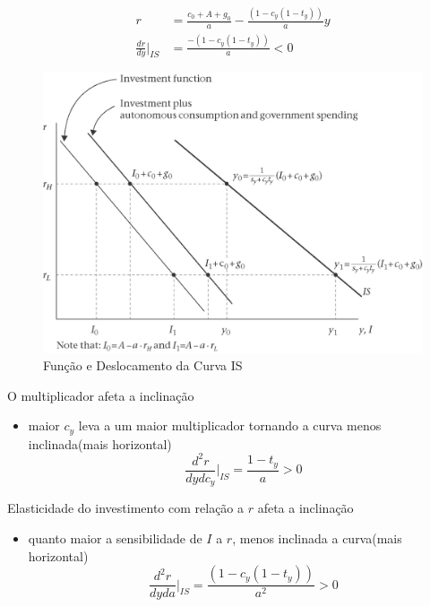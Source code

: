 \documentclass[a4paper,12pt]{article}[abntex2]
\begin{document}
\begin{align*}
    r &= \frac{c_0 + A + g_0}{a} - \frac{(1 - c_y(1 - t_y))}{a}y \\
    \frac{dr}{dy}\bigg|_{IS} &= \frac{-(1 - c_y(1 - t_y))}{a} < 0
\end{align*}

\begin{figure}[H]
    \centering
    \caption{Função e Deslocamento da Curva IS}
    \includegraphics[width=0.75\linewidth]{Imagens/a2i1.png}
\end{figure}



O multiplicador afeta a inclinação\begin{itemize}
    \item maior $c_y$ leva a um maior multiplicador tornando a curva menos inclinada(mais horizontal)
    $$
    \frac{d^2r}{dydc_y}\bigg|_{IS}=\frac{1-t_y}{a}>0
    $$
\end{itemize}

Elasticidade do investimento com relação a $r$ afeta a inclinação\begin{itemize}
        \item quanto maior a sensibilidade de $I$ a $r$, menos inclinada a curva(mais horizontal)
        $$
        \frac{d^2r}{dyda}\bigg|_{IS}=\frac{(1-c_y(1-t_y))}{a^2}>0
        $$
    \end{itemize} 
\end{document}
